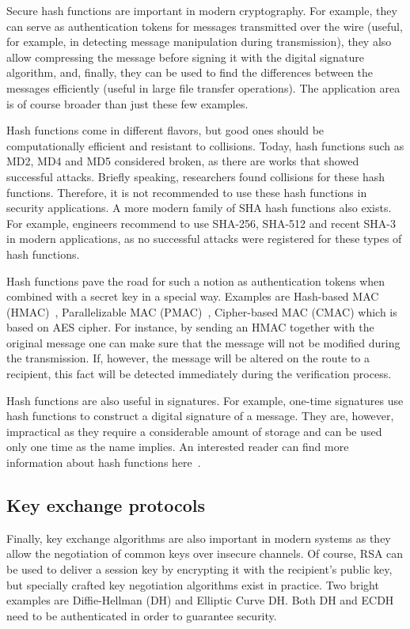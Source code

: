 Secure hash functions are important in modern cryptography. 
For example, they can serve as authentication tokens for messages transmitted over the 
wire (useful, for example, in detecting message manipulation during transmission), 
they also allow compressing the message before signing it with the digital signature 
algorithm, and, finally, they can be used to find the differences between the messages 
efficiently (useful in large file transfer operations). The application area is of 
course broader than just these few examples. 

Hash functions come in different flavors, but good ones should be computationally 
efficient and resistant to collisions. Today, hash functions such as MD2, MD4 and MD5 
considered broken, as there are works that showed successful attacks. Briefly speaking, 
researchers found collisions for these hash functions. Therefore, it is 
not recommended to use these hash functions in security applications. A more modern 
family of SHA hash functions also exists. For example, engineers recommend to use SHA-256, 
SHA-512 and recent SHA-3 in modern applications, as no successful attacks were registered for 
these types of hash functions.

Hash functions pave the road for such a notion as authentication tokens when combined with a 
secret key in a special way. Examples are Hash-based MAC (HMAC)~\cite{Stinson:Cryptography}, 
Parallelizable MAC (PMAC)~\cite{pmac}, Cipher-based MAC (CMAC) which is based on AES cipher. 
For instance, by sending an HMAC together with the original message one can make sure that 
the message will not be modified during the transmission. If, however, the message will 
be altered on the route to a recipient, this fact will be detected immediately during the 
verification process.

Hash functions are also useful in signatures. For example, one-time signatures use 
hash functions to construct a digital signature of a message. They are, however, impractical
as they require a considerable amount of storage and can be used only one time as the name implies. 
An interested reader can find more information about hash functions here~\cite{Stinson:Cryptography}.

\subsection{Key exchange protocols}

Finally, key exchange algorithms are also important in modern systems as they allow 
the negotiation of common keys over insecure channels. Of course, RSA can be used to deliver a session key
by encrypting it with the recipient's public key, but specially crafted key negotiation
algorithms exist in practice. Two bright examples are Diffie-Hellman (DH) and Elliptic Curve 
DH. Both DH and ECDH need to be authenticated in order to guarantee security.


